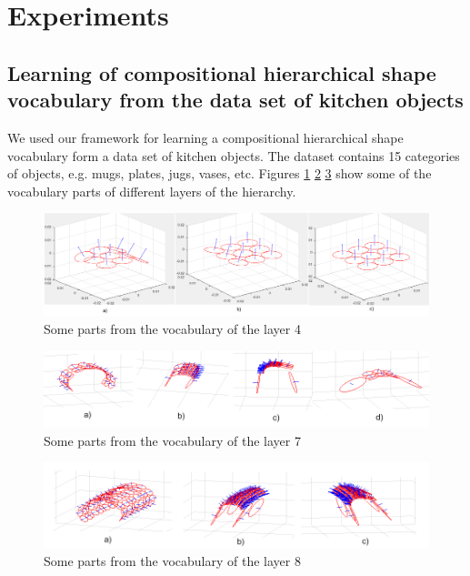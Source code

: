 \documentclass[runningheads]{llncs}
\begin{document}
\section{Experiments \label{sec:Experiments}}

\subsection{Learning of compositional hierarchical shape vocabulary from the data set of kitchen objects\label{sec:DataSet}}

We used our framework for learning a compositional hierarchical
shape vocabulary form a data set of kitchen objects. The dataset
contains 15 categories of objects, e.g. mugs, plates, jugs, vases,
etc. Figures \ref{fig:parts4} \ref{fig:parts7} \ref{fig:parts8} show
some of the vocabulary parts of different layers of the hierarchy.
\begin{figure}[t!]
\centering
\includegraphics[scale=0.3]{parts4}
\caption{Some parts from the vocabulary of the layer 4}
\label{fig:parts4}
\end{figure}
\begin{figure}[t!]
\centering
\includegraphics[scale=0.45]{parts7}
\caption{Some parts from the vocabulary of the layer 7}
\label{fig:parts7}
\end{figure}
\begin{figure}[t!]
\centering
\includegraphics[scale=0.45]{parts8}
\caption{Some parts from the vocabulary of the layer 8}
\label{fig:parts8}
\end{figure}
\end{document}
